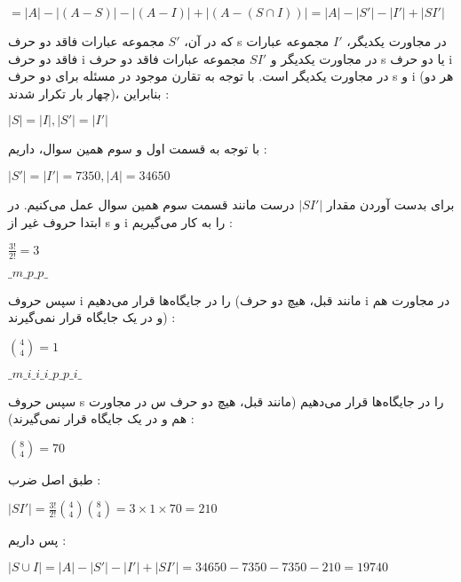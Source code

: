 \begin{problem}
\begin{enumerate}
{\begin{center}
            $= |A| - |(A - S)| - |(A - I)| + |(A - (S \cap I))| = |A| - |S'| - |I'| + |SI'|$
        \end{center}
        که در آن،
        $S'$
        مجموعه عبارات فاقد دو حرف
        s
        در مجاورت یکدیگر،
        $I'$
        مجموعه عبارات فاقد دو حرف
        i
        در مجاورت یکدیگر و
        $SI'$
        مجموعه عبارات فاقد دو حرف
        s
        یا دو حرف
        i
        در مجاورت یکدیگر است.
        با توجه به تقارن موجود در مسئله برای دو حرف
        s
        و
        i
        (هر دو چهار بار تکرار شدند)،
        بنابراین :    
        \begin{center}
            $|S| = |I|, |S'| = |I'|$
        \end{center}
        با توجه به قسمت اول و سوم همین سوال، داریم :
        \begin{center}
            $|S'| = |I'| = 7350, |A| = 34650$
        \end{center}
        
        برای بدست آوردن مقدار 
        $|SI'|$
        درست مانند قسمت سوم همین سوال عمل می‌کنیم. در ابتدا
        حروف غیر از
        s و i
        را به کار می‌گیریم :
        \begin{center}
            $\frac{3!}{2!} = 3$
    
            $\_ m \_ p \_ p \_$
        \end{center}
        سپس حروف
        i
        را در جایگاه‌ها قرار می‌دهیم
        (مانند قبل، هیچ دو حرف
        i
        در مجاورت هم و در یک جایگاه قرار نمی‌گیرند) :
        \begin{center}
            $\binom{4}{4} = 1$
    
            $\_ m \_ i \_ i \_ i \_ p \_ p \_ i \_$
        \end{center}
        سپس حروف
        s
        را در جایگاه‌ها قرار می‌دهیم
        (مانند قبل، هیچ دو حرف
        س
        در مجاورت هم و در یک جایگاه قرار نمی‌گیرند) :
        \begin{center}
            $\binom{8}{4} = 70$
        \end{center}
    
        طبق اصل ضرب :
        \begin{center}
            $|SI'| = \frac{3!}{2!} \binom{4}{4} \binom{8}{4} = 3 \times 1 \times 70 = 210$
        \end{center}
    
        پس داریم :
        \begin{center}
            $|S \cup I| = |A| - |S'| - |I'| + |SI'| = 34650 - 7350 - 7350 - 210 = 19740$
        \end{center}
      }
  
    \end{enumerate}
\end{problem}